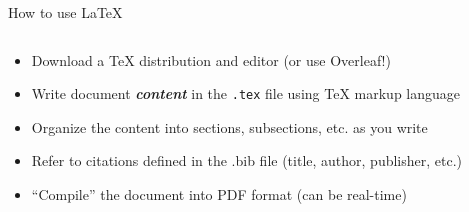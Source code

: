 \documentclass{beamer}
\begin{document}
\begin{frame}[fragile]{How to use \LaTeX{}}
\begin{columns}
    \footnotesize
    \begin{column}{\textwidth}
       \begin{itemize}
            \item Download a TeX distribution and editor (or use Overleaf!)
            \item Write document \textbf{\textit{content}} in the \texttt{.tex} file using TeX markup language
            \item Organize the content into sections, subsections, etc. as you write
            \item Refer to citations defined in the .bib file (title, author, publisher, etc.)
            \item “Compile” the document into PDF format (can be real-time)
        \end{itemize}     
    \end{column}
\end{columns}


\end{frame}
\end{document}
